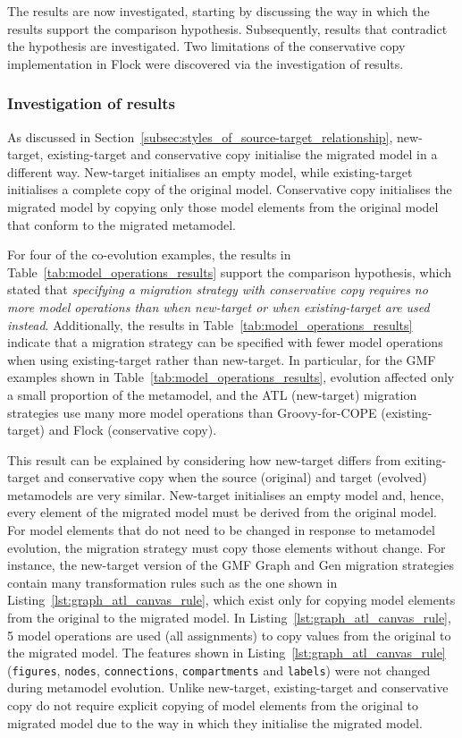 The results are now investigated, starting by discussing the way in which the results support the comparison hypothesis. Subsequently, results that contradict the hypothesis are investigated. Two limitations of the conservative copy implementation in Flock were discovered via the investigation of results.

\subsubsection{Investigation of results}
As discussed in Section~\ref{subsec:styles_of_source-target_relationship}, new-target, existing-target and conservative copy initialise the migrated model in a different way. New-target initialises an empty model, while existing-target initialises a complete copy of the original model. Conservative copy initialises the migrated model by copying only those model elements from the original model that conform to the migrated metamodel.


For four of the co-evolution examples, the results in Table~\ref{tab:model_operations_results} support the comparison hypothesis, which stated that \emph{specifying a migration strategy with conservative copy requires no more model operations than when new-target or when existing-target are used instead}. Additionally, the results in Table~\ref{tab:model_operations_results} indicate that a migration strategy can be specified with fewer model operations when using existing-target rather than new-target. In particular, for the GMF examples shown in Table~\ref{tab:model_operations_results}, evolution affected only a small proportion of the metamodel, and the ATL (new-target) migration strategies use many more model operations than Groovy-for-COPE (existing-target) and Flock (conservative copy). 

This result can be explained by considering how new-target differs from exiting-target and conservative copy when the source (original) and target (evolved) metamodels are very similar. New-target initialises an empty model and, hence, every element of the migrated model must be derived from the original model. For model elements that do not need to be changed in response to metamodel evolution, the migration strategy must copy those elements without change. For instance, the new-target version of the GMF Graph and Gen migration strategies contain many transformation rules such as the one shown in Listing~\ref{lst:graph_atl_canvas_rule}, which exist only for copying model elements from the original to the migrated model. In Listing~\ref{lst:graph_atl_canvas_rule}, 5 model operations are used (all assignments) to copy values from the original to the migrated model. The features shown in Listing~\ref{lst:graph_atl_canvas_rule} (\texttt{fi\-gu\-r\-es}, \texttt{no\-d\-es}, \texttt{co\-nn\-ec\-ti\-o\-ns}, \texttt{co\-mp\-ar\-tm\-en\-ts} and \texttt{la\-be\-ls}) were not changed during metamodel evolution. Unlike new-target, existing-target and conservative copy do not require explicit copying of model elements from the original to migrated model due to the way in which they initialise the migrated model.

